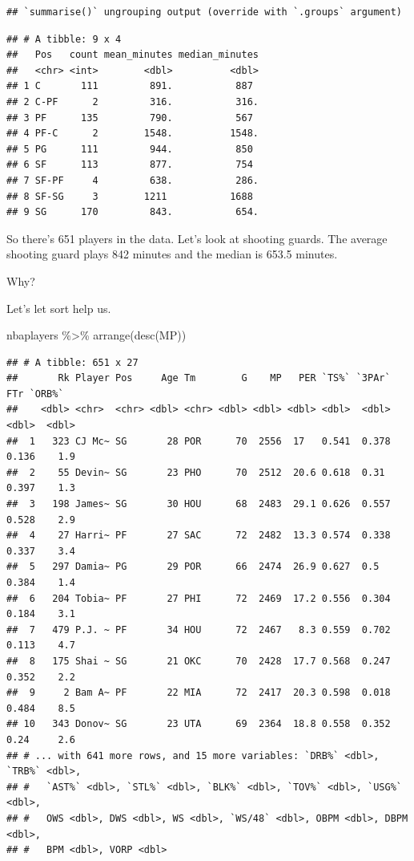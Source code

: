 \documentclass[
]{book}
\newenvironment{Shaded}{\begin{snugshade}}{\end{snugshade}}
\newcommand{\FunctionTok}[1]{\textcolor[rgb]{0.00,0.00,0.00}{#1}}
\newcommand{\NormalTok}[1]{#1}
\newcommand{\SpecialCharTok}[1]{\textcolor[rgb]{0.00,0.00,0.00}{#1}}
\begin{document}
\begin{verbatim}
## `summarise()` ungrouping output (override with `.groups` argument)
\end{verbatim}

\begin{verbatim}
## # A tibble: 9 x 4
##   Pos   count mean_minutes median_minutes
##   <chr> <int>        <dbl>          <dbl>
## 1 C       111         891.           887 
## 2 C-PF      2         316.           316.
## 3 PF      135         790.           567 
## 4 PF-C      2        1548.          1548.
## 5 PG      111         944.           850 
## 6 SF      113         877.           754 
## 7 SF-PF     4         638.           286.
## 8 SF-SG     3        1211           1688 
## 9 SG      170         843.           654.
\end{verbatim}

So there's 651 players in the data. Let's look at shooting guards. The average shooting guard plays 842 minutes and the median is 653.5 minutes.

Why?

Let's let sort help us.

\begin{Shaded}
\begin{Highlighting}[]
\NormalTok{nbaplayers }\SpecialCharTok{\%\textgreater{}\%} \FunctionTok{arrange}\NormalTok{(}\FunctionTok{desc}\NormalTok{(MP))}
\end{Highlighting}
\end{Shaded}

\begin{verbatim}
## # A tibble: 651 x 27
##       Rk Player Pos     Age Tm        G    MP   PER `TS%` `3PAr`   FTr `ORB%`
##    <dbl> <chr>  <chr> <dbl> <chr> <dbl> <dbl> <dbl> <dbl>  <dbl> <dbl>  <dbl>
##  1   323 CJ Mc~ SG       28 POR      70  2556  17   0.541  0.378 0.136    1.9
##  2    55 Devin~ SG       23 PHO      70  2512  20.6 0.618  0.31  0.397    1.3
##  3   198 James~ SG       30 HOU      68  2483  29.1 0.626  0.557 0.528    2.9
##  4    27 Harri~ PF       27 SAC      72  2482  13.3 0.574  0.338 0.337    3.4
##  5   297 Damia~ PG       29 POR      66  2474  26.9 0.627  0.5   0.384    1.4
##  6   204 Tobia~ PF       27 PHI      72  2469  17.2 0.556  0.304 0.184    3.1
##  7   479 P.J. ~ PF       34 HOU      72  2467   8.3 0.559  0.702 0.113    4.7
##  8   175 Shai ~ SG       21 OKC      70  2428  17.7 0.568  0.247 0.352    2.2
##  9     2 Bam A~ PF       22 MIA      72  2417  20.3 0.598  0.018 0.484    8.5
## 10   343 Donov~ SG       23 UTA      69  2364  18.8 0.558  0.352 0.24     2.6
## # ... with 641 more rows, and 15 more variables: `DRB%` <dbl>, `TRB%` <dbl>,
## #   `AST%` <dbl>, `STL%` <dbl>, `BLK%` <dbl>, `TOV%` <dbl>, `USG%` <dbl>,
## #   OWS <dbl>, DWS <dbl>, WS <dbl>, `WS/48` <dbl>, OBPM <dbl>, DBPM <dbl>,
## #   BPM <dbl>, VORP <dbl>
\end{verbatim}
\end{document}
